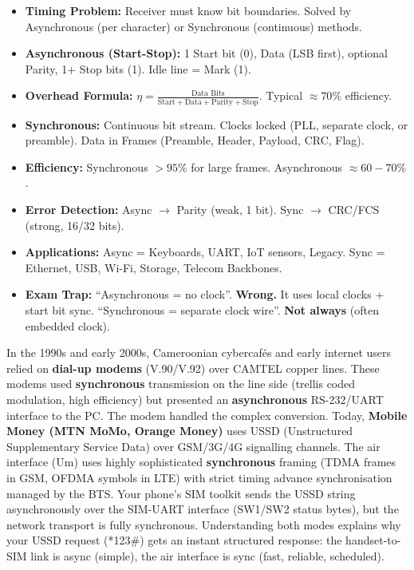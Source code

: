 \documentclass[11pt]{article}
\newcounter{popsec}
\newcounter{popsub}
\newcommand{\courssub}[1]{%
  \stepcounter{popsub}%
  \par\vspace{9pt}\noindent{\popxbold\fontsize{11.5}{13}\selectfont\color{popink}{\color{poporange}\thepopsec.\thepopsub}\hspace{6pt}#1}\par\nopagebreak\vspace{4pt}
}
\begin{document}
\courssub{Summary and Key Points}

\begin{aretenir}
\begin{itemize}
    \item \textbf{Timing Problem:} Receiver must know bit boundaries. Solved by Asynchronous (per character) or Synchronous (continuous) methods.
    \item \textbf{Asynchronous (Start-Stop):} 1 Start bit (0), Data (LSB first), optional Parity, 1+ Stop bits (1). Idle line = Mark (1).
    \item \textbf{Overhead Formula:} $\eta = \frac{\text{Data Bits}}{\text{Start} + \text{Data} + \text{Parity} + \text{Stop}}$. Typical $\approx 70\%$ efficiency.
    \item \textbf{Synchronous:} Continuous bit stream. Clocks locked (PLL, separate clock, or preamble). Data in Frames (Preamble, Header, Payload, CRC, Flag).
    \item \textbf{Efficiency:} Synchronous $> 95\%$ for large frames. Asynchronous $\approx 60-70\%$.
    \item \textbf{Error Detection:} Async $\rightarrow$ Parity (weak, 1 bit). Sync $\rightarrow$ CRC/FCS (strong, 16/32 bits).
    \item \textbf{Applications:} Async = Keyboards, UART, IoT sensors, Legacy. Sync = Ethernet, USB, Wi-Fi, Storage, Telecom Backbones.
    \item \textbf{Exam Trap:} ``Asynchronous = no clock''. \textbf{Wrong.} It uses local clocks + start bit sync. ``Synchronous = separate clock wire''. \textbf{Not always} (often embedded clock).
\end{itemize}
\end{aretenir}

\begin{savaistu}
In the 1990s and early 2000s, Cameroonian cybercafés and early internet users relied on \textbf{dial-up modems} (V.90/V.92) over CAMTEL copper lines. These modems used \textbf{synchronous} transmission on the line side (trellis coded modulation, high efficiency) but presented an \textbf{asynchronous} RS-232/UART interface to the PC. The modem handled the complex conversion.
Today, \textbf{Mobile Money (MTN MoMo, Orange Money)} uses USSD (Unstructured Supplementary Service Data) over GSM/3G/4G signalling channels. The air interface (Um) uses highly sophisticated \textbf{synchronous} framing (TDMA frames in GSM, OFDMA symbols in LTE) with strict timing advance synchronisation managed by the BTS. Your phone's SIM toolkit sends the USSD string asynchronously over the SIM-UART interface (SW1/SW2 status bytes), but the network transport is fully synchronous. Understanding both modes explains why your USSD request (*123\#) gets an instant structured response: the handset-to-SIM link is async (simple), the air interface is sync (fast, reliable, scheduled).
\end{savaistu}
\end{document}
